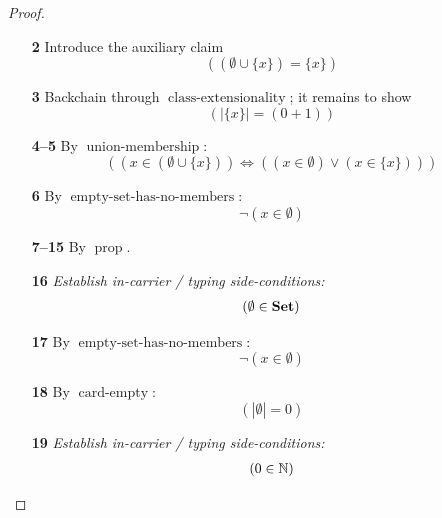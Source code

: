 \documentclass[11pt]{article}
\theoremstyle{plain}
\begin{document}
\begin{proof}
\begin{itemize}[leftmargin=2.8em, itemsep=4pt, parsep=1pt]
  \item[\textbf{2}] Introduce the auxiliary claim
\begin{equation*}
((\emptyset \cup \{x\}) = \{x\})
\end{equation*}

  \item[\textbf{3}] Backchain through $\operatorname{class\text{-}extensionality}$; it remains to show
\begin{equation*}
(|\{x\}| = (0 + 1))
\end{equation*}

  \item[\textbf{4--5}] By $\operatorname{union\text{-}membership}$:
\begin{equation*}
((x \in (\emptyset \cup \{x\})) \Leftrightarrow ((x \in \emptyset) \vee (x \in \{x\})))
\end{equation*}

  \item[\textbf{6}] By $\operatorname{empty\text{-}set\text{-}has\text{-}no\text{-}members}$:
\begin{equation*}
\neg (x \in \emptyset)
\end{equation*}

  \item[\textbf{7--15}] By $\operatorname{prop}$.
  \item[\textbf{16}] \emph{Establish in-carrier / typing side-conditions:}
\begin{equation*}
\begin{array}{@{}l@{}}
(\emptyset \in \mathbf{Set})
\end{array}
\end{equation*}

  \item[\textbf{17}] By $\operatorname{empty\text{-}set\text{-}has\text{-}no\text{-}members}$:
\begin{equation*}
\neg (x \in \emptyset)
\end{equation*}

  \item[\textbf{18}] By $\operatorname{card\text{-}empty}$:
\begin{equation*}
(|\emptyset| = 0)
\end{equation*}

  \item[\textbf{19}] \emph{Establish in-carrier / typing side-conditions:}
\begin{equation*}
\begin{array}{@{}l@{}}
(0 \in \mathbb{N})
\end{array}
\end{equation*}


\end{itemize}
\end{proof}
\end{document}
